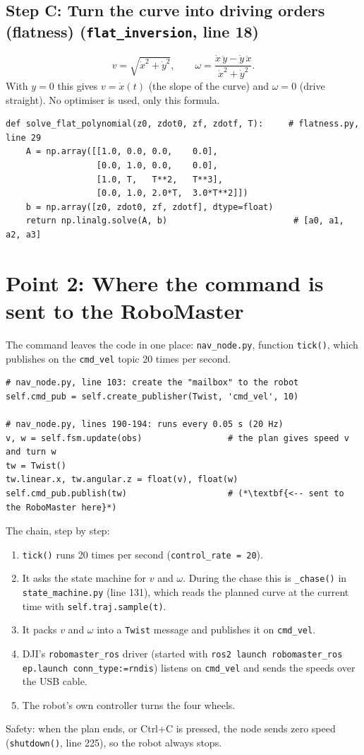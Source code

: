 \documentclass[11pt,a4paper]{article}
\begin{document}
\subsection*{Step C: Turn the curve into driving orders (flatness) \quad(\texttt{flat\_inversion}, line 18)}
\[
v=\sqrt{\dot x^2+\dot y^2},\qquad \omega=\frac{\dot x\,\ddot y-\dot y\,\ddot x}{\dot x^2+\dot y^2}.
\]
With $y=0$ this gives $v=\dot x(t)$ (the slope of the curve) and $\omega=0$ (drive straight). No optimiser is used, only this formula.

\begin{lstlisting}
def solve_flat_polynomial(z0, zdot0, zf, zdotf, T):     # flatness.py, line 29
    A = np.array([[1.0, 0.0, 0.0,    0.0],
                  [0.0, 1.0, 0.0,    0.0],
                  [1.0, T,   T**2,   T**3],
                  [0.0, 1.0, 2.0*T,  3.0*T**2]])
    b = np.array([z0, zdot0, zf, zdotf], dtype=float)
    return np.linalg.solve(A, b)                         # [a0, a1, a2, a3]
\end{lstlisting}
\section{Point 2: Where the command is sent to the RoboMaster}
The command leaves the code in one place: \texttt{nav\_node.py}, function \texttt{tick()}, which publishes on the \texttt{cmd\_vel} topic 20 times per second.
\begin{lstlisting}
# nav_node.py, line 103: create the "mailbox" to the robot
self.cmd_pub = self.create_publisher(Twist, 'cmd_vel', 10)

# nav_node.py, lines 190-194: runs every 0.05 s (20 Hz)
v, w = self.fsm.update(obs)                 # the plan gives speed v and turn w
tw = Twist()
tw.linear.x, tw.angular.z = float(v), float(w)
self.cmd_pub.publish(tw)                    # (*\textbf{<-- sent to the RoboMaster here}*)
\end{lstlisting}
The chain, step by step:
\begin{enumerate}
  \item \texttt{tick()} runs 20 times per second (\texttt{control\_rate = 20}).
  \item It asks the state machine for $v$ and $\omega$. During the chase this is \texttt{\_chase()} in \texttt{state\_machine.py} (line 131), which reads the planned curve at the current time with \texttt{self.traj.sample(t)}.
  \item It packs $v$ and $\omega$ into a \texttt{Twist} message and publishes it on \texttt{cmd\_vel}.
  \item DJI's \texttt{robomaster\_ros} driver (started with \texttt{ros2 launch robomaster\_ros ep.launch conn\_type:=rndis}) listens on \texttt{cmd\_vel} and sends the speeds over the USB cable.
  \item The robot's own controller turns the four wheels.
\end{enumerate}
Safety: when the plan ends, or Ctrl+C is pressed, the node sends zero speed (\texttt{shutdown()}, line 225), so the robot always stops.
\end{document}
